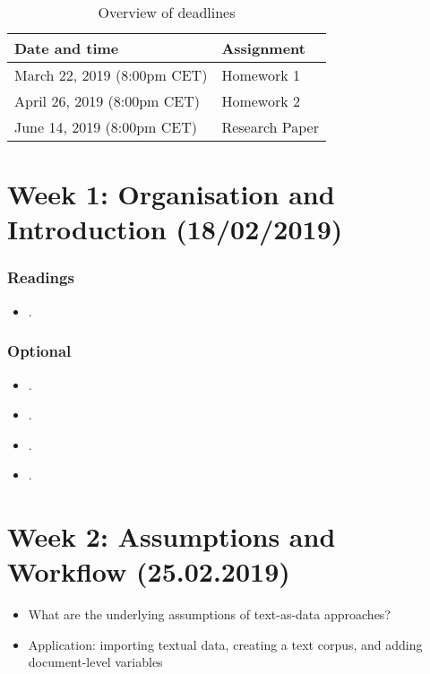 \documentclass[abstract=on,parskip=full,headings=standardclasses,fontsize=11pt,paper=a4]{scrartcl}
\begin{document}
\begin{table}[h] \centering \doublespacing
\caption*{Overview of deadlines}
\begin{tabular}{ l l } 
\toprule
Date and time & Assignment \\
\midrule
March 22, 2019 (8:00pm CET) &  Homework 1  \\
April 26, 2019 (8:00pm CET) & Homework 2  \\
June 14, 2019 (8:00pm CET) & Research Paper   \\
\bottomrule
\end{tabular}
\end{table}



\tableofcontents


\section{Week 1: Organisation and Introduction (18/02/2019)}


\subsubsection*{Readings}
\begin{itemize}
\item {}.
\end{itemize}

\subsubsection*{Optional}
\begin{itemize}
\item {}.
\item {}.
\item {}.
\item {}.
\end{itemize}


\section{Week 2: Assumptions and  Workflow (25.02.2019)}

\begin{itemize}
\item What are the underlying assumptions of text-as-data approaches?
\item Application: importing textual data, creating a text corpus, and adding document-level variables
\end{itemize}
\end{document}

